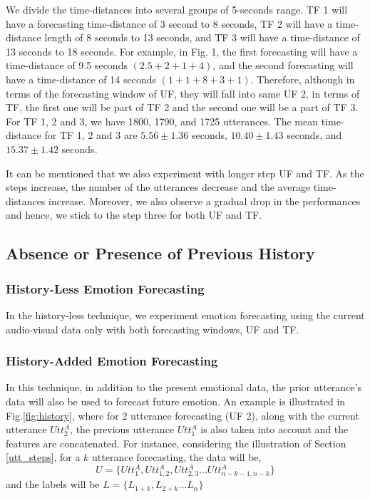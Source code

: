 We divide the time-distances into several groups of 5-seconds range. TF 1 will have a forecasting time-distance of 3 second to 8 seconds, TF 2 will have a  time-distance length of 8 seconds to 13 seconds, and TF 3 will have a time-distance of 13 seconds to 18 seconds.  For example, in Fig. 1, the first forecasting will have a time-distance of 9.5 seconds $(2.5+2+1+4)$, and the second forecasting will have a time-distance of 14 seconds $(1+1+8+3+1)$. Therefore, although in terms of the forecasting window of UF, they will fall into same UF 2, in terms of TF, the first one will be part of TF 2 and the second one will be a part of TF 3.  For TF 1, 2 and 3, we have 1800, 1790, and 1725 utterances. The mean time-distance for TF 1, 2 and 3 are $5.56\pm1.36$ seconds, $10.40\pm1.43$ seconds, and $15.37\pm1.42$ seconds. 

It can be mentioned that we also experiment with longer step UF and TF. As the steps increase, the number of the utterances decrease and the average time-distances increase. Moreover, we also observe a gradual drop in the performances and hence, we stick to the step three for both UF and TF. 


\subsection{Absence or Presence of Previous History}
\subsubsection{History-Less Emotion Forecasting}
In the history-less technique, we experiment emotion forecasting using the current audio-visual data only with both forecasting windows, UF and TF. 
\subsubsection{History-Added Emotion Forecasting}
\label{history}
In this technique, in addition to the present emotional data, the prior utterance's data will also be used to forecast future emotion. An example is illustrated in Fig.\ref{fig:history}, where for 2 utterance forecasting (UF 2), along with the current utterance $Utt_{2}^A$, the previous utterance $Utt_{1}^A$ is also taken into account and the features are concatenated. For instance, considering the illustration of Section \ref{utt_steps}, for a $k$ utterance forecasting, the data will be,
\[
U=\{Utt_{1}^A, Utt_{1,2}^A, Utt_{2,3}^A...Utt_{n-k-1,n-k}^A\}
\]
and the labels will be
$L=\{L_{1+k},L_{2+k}...L_n\}$

